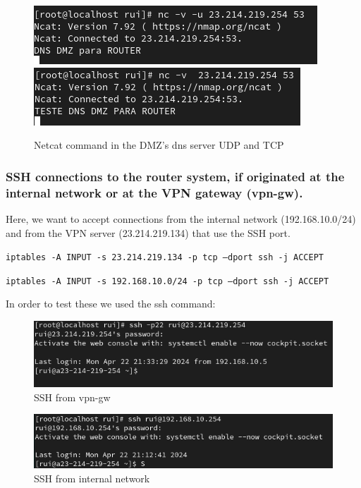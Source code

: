 \documentclass{article}
\begin{document}
\begin{figure}[H]
    \centering
    \includegraphics[scale=0.5]{in/in_dns_dmz.png}
    \includegraphics[scale=0.5]{in/in_dns_dmz_tcp.png}
    \caption{Netcat command in the DMZ's dns server UDP and TCP}
    \label{fig:network-arc}
\end{figure}

\subsubsection{SSH connections to the router system, if originated at the internal network or at the VPN gateway (vpn-gw).} 
\quad Here, we want to accept connections from the internal network (192.168.10.0/24) and from the VPN server (23.214.219.134) that use the SSH port.\par
\texttt{}\par
\texttt{iptables -A INPUT -s 23.214.219.134 -p tcp --dport ssh -j ACCEPT}\par
\texttt{iptables -A INPUT -s 192.168.10.0/24 -p tcp --dport ssh -j ACCEPT}
\texttt{}\par

In order to test these we used the ssh command:
\begin{figure}[H]
    \centering
    \includegraphics[scale=0.5]{in/in_ssh_dmz.png}
    \caption{SSH from vpn-gw}
    \label{fig:network-arc}
\end{figure}

\begin{figure}[H]
    \centering
    \includegraphics[scale=0.5]{in/in_ssh_internal.png}
    \caption{SSH from internal network}
    \label{fig:network-arc}
\end{figure}
\end{document}

